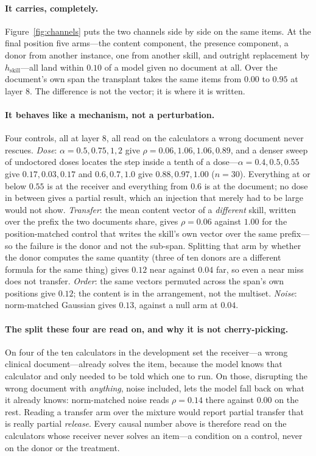 \documentclass{article}
\begin{document}
\paragraph{It carries, completely.} Figure~\ref{fig:channels} puts the two
channels side by side on the same items. At the final position five arms---the
content component, the presence component, a donor from another instance, one
from another skill, and outright replacement by $h_{\text{skill}}$---all land
within $0.10$ of a model given no document at all. Over the document's own span
the transplant takes the same items from $0.00$ to $0.95$ at layer $8$. The
difference is not the vector; it is where it is written.



\paragraph{It behaves like a mechanism, not a perturbation.} Four controls, all
at layer 8, all read on the calculators a wrong document never rescues.
\emph{Dose}: $\alpha = 0.5, 0.75, 1, 2$ give $\rho = 0.06, 1.06, 1.06, 0.89$,
and a denser sweep of undoctored doses locates the step inside a tenth of a
dose---$\alpha = 0.4, 0.5, 0.55$ give $0.17, 0.03, 0.17$ and $0.6, 0.7, 1.0$
give $0.88, 0.97, 1.00$ ($n=30$). Everything at or below $0.55$ is at the
receiver and everything from $0.6$ is at the document; no dose in between gives
a partial result, which an injection that merely had to be large would not show.
\emph{Transfer}: the mean content vector of a \emph{different} skill, written
over the prefix the two documents share, gives $\rho = 0.06$ against $1.00$ for
the position-matched control that writes the skill's own vector over the same
prefix---so the failure is the donor and not the sub-span. Splitting that arm by
whether the donor computes the same quantity (three of ten donors are a
different formula for the same thing) gives $0.12$ near against $0.04$ far, so
even a near miss does not transfer. \emph{Order}: the same vectors permuted
across the span's own positions give $0.12$; the content is in the arrangement,
not the multiset. \emph{Noise}: norm-matched Gaussian gives $0.13$, against a
null arm at $0.04$.

\paragraph{The split these four are read on, and why it is not cherry-picking.}
On four of the ten calculators in the development set the receiver---a wrong
clinical document---already solves the item, because the model knows that
calculator and only needed to be told which one to run. On those, disrupting the
wrong document with \emph{anything}, noise included, lets the model fall back on
what it already knows: norm-matched noise reads $\rho = 0.14$ there against
$0.00$ on the rest. Reading a transfer arm over the mixture would report partial
transfer that is really partial \emph{release}. Every causal number above is
therefore read on the calculators whose receiver never solves an item---a
condition on a control, never on the donor or the treatment.
\end{document}
